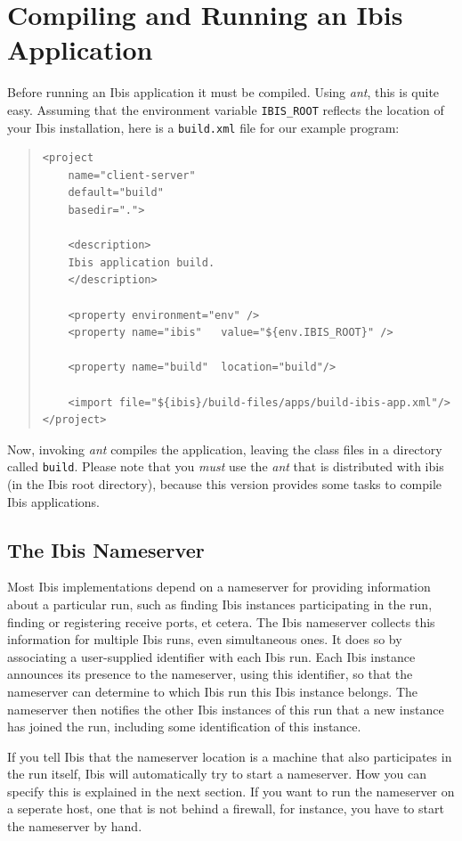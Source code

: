 \documentclass[10pt]{article}
\newcommand{\mysection}[1]{\section{#1}\label{#1}}
\newcommand{\mysubsection}[1]{\subsection{#1}\label{#1}}
\begin{document}
\mysection{Compiling and Running an Ibis Application}

Before running an Ibis application it must be compiled.  Using
\emph{ant}, this is quite easy. Assuming that the environment variable
\texttt{IBIS\_ROOT} reflects the location of your Ibis installation,
here is a \texttt{build.xml} file
for our example program:

{\small
\begin{quote}
\begin{verbatim}
<project
    name="client-server"
    default="build"
    basedir=".">

    <description>
    Ibis application build.
    </description>

    <property environment="env" />
    <property name="ibis"   value="${env.IBIS_ROOT}" />

    <property name="build"  location="build"/>

    <import file="${ibis}/build-files/apps/build-ibis-app.xml"/>
</project>
\end{verbatim}
\end{quote}
}

Now, invoking \emph{ant} compiles the application, leaving the class files
in a directory called \texttt{build}.
Please note that you \emph{must} use the \emph{ant} that is
distributed with ibis (in the Ibis root directory), because this
version provides some tasks to compile Ibis applications.

\mysubsection{The Ibis Nameserver}

Most Ibis implementations depend on a nameserver for providing
information about a particular run, such as finding Ibis instances
participating in the run, finding or registering receive ports, et cetera.
The Ibis nameserver collects this information for multiple Ibis
runs, even simultaneous ones. It does so by associating a user-supplied
identifier with each Ibis run. Each Ibis instance announces its
presence to the nameserver, using this identifier, so that the
nameserver can determine to which Ibis run this Ibis instance belongs.
The nameserver then notifies the other Ibis instances of this run that
a new instance has joined the run, including some identification of
this instance.

If you tell Ibis that the nameserver location is a machine that also
participates in the run itself, Ibis will automatically try to start
a nameserver. How you can specify this is explained in the next section.
If you want to run the nameserver on a seperate host, one that is not
behind a firewall, for instance, you have to start the nameserver by
hand.
\end{document}
